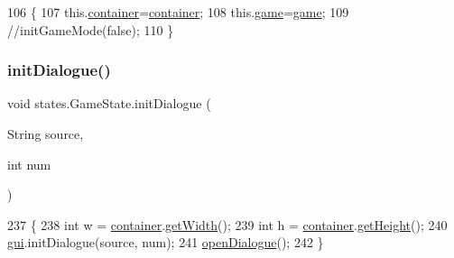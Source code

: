 \begin{DoxyCode}
106                                                                                          \{
107        this.\mbox{\hyperlink{classstates_1_1_game_state_a88b0df4b57ada742c53e4e1ee3b25827}{container}}=\mbox{\hyperlink{classstates_1_1_game_state_a88b0df4b57ada742c53e4e1ee3b25827}{container}};
108        this.\mbox{\hyperlink{classstates_1_1_game_state_a5f563e34a3fc7d777396b68e00b321f5}{game}}=\mbox{\hyperlink{classstates_1_1_game_state_a5f563e34a3fc7d777396b68e00b321f5}{game}};
109        \textcolor{comment}{//initGameMode(false);}
110     \}
\end{DoxyCode}
\mbox{\label{classstates_1_1_game_state_a5561200f7d5c881b84ce6369f6fad705}} 
\subsubsection{\texorpdfstring{init\+Dialogue()}{initDialogue()}}
{\footnotesize\ttfamily void states.\+Game\+State.\+init\+Dialogue (\begin{DoxyParamCaption}\item[{String}]{source,  }\item[{int}]{num }\end{DoxyParamCaption})\hspace{0.3cm}{\ttfamily [inline]}}


\begin{DoxyCode}
237                                                      \{
238         \textcolor{keywordtype}{int} w = \mbox{\hyperlink{classstates_1_1_game_state_a88b0df4b57ada742c53e4e1ee3b25827}{container}}.\mbox{\hyperlink{classorg_1_1newdawn_1_1slick_1_1_game_container_a938fe1a28567182445e60450915d5f69}{getWidth}}();
239         \textcolor{keywordtype}{int} h = \mbox{\hyperlink{classstates_1_1_game_state_a88b0df4b57ada742c53e4e1ee3b25827}{container}}.\mbox{\hyperlink{classorg_1_1newdawn_1_1slick_1_1_game_container_a7eff88473fe5715fdfc2f92e8cb48521}{getHeight}}();
240         \mbox{\hyperlink{namespacegui}{gui}}.initDialogue(source, num);
241         \mbox{\hyperlink{classstates_1_1_game_state_a4d77661bfb3bf9d51cb10807fb300215}{openDialogue}}();
242     \}
\end{DoxyCode}
\mbox{\label{classstates_1_1_game_state_a9ed552e4fa17b64ddca450de007ba411}} 
